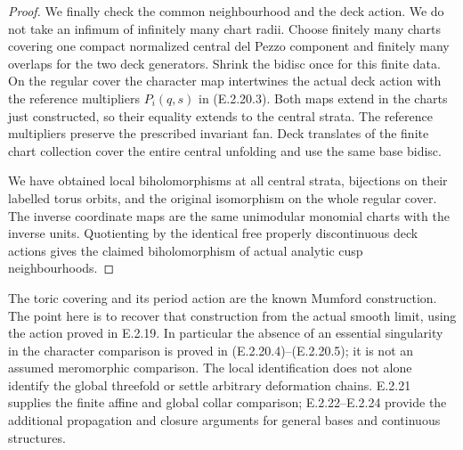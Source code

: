 \begin{proof}
We finally check the
common neighbourhood
and the deck action.
We do not take an
infimum of infinitely
many chart radii.
Choose finitely many
charts covering one
compact normalized
central del Pezzo
component and finitely
many overlaps for
the two deck generators.
Shrink the bidisc once
for this finite data.
On the regular cover
the character map
intertwines the actual
deck action with the
reference multipliers
$P_i(q,s)$ in
(E.2.20.3).  Both maps
extend in the charts
just constructed, so
their equality extends
to the central strata.
The reference multipliers
preserve the prescribed
invariant fan.  Deck
translates of the finite
chart collection cover
the entire central
unfolding and use the
same base bidisc.

We have obtained local
biholomorphisms at all
central strata, bijections
on their labelled torus
orbits, and the original
isomorphism on the whole
regular cover.  The
inverse coordinate maps
are the same unimodular
monomial charts with
the inverse units.
Quotienting by the
identical free properly
discontinuous deck
actions gives the
claimed biholomorphism
of actual analytic
cusp neighbourhoods.
\end{proof}

\begin{remark}
The toric covering and its
period action are the known
Mumford construction.  The
point here is to recover
that construction from
the actual smooth limit,
using the action proved
in E.2.19.  In particular
the absence of an essential
singularity in the character
comparison is proved in
(E.2.20.4)--(E.2.20.5);
it is not an assumed
meromorphic comparison.
The local identification
does not alone identify
the global threefold or
settle arbitrary deformation
chains.  E.2.21 supplies the
finite affine and global collar
comparison; E.2.22--E.2.24
provide the additional propagation
and closure arguments for general
bases and continuous structures.
\end{remark}

